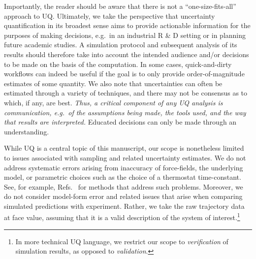 Importantly, the reader should be aware that there is not a ``one-size-fits-all'' approach to UQ.  Ultimately, we take the perspective that uncertainty quantification in its broadest sense aims to provide actionable information for the purposes of making decisions, e.g.\ in an industrial R \& D setting or in planning future academic studies.  A simulation protocol and subsequent analysis of its results should therefore take into account the intended audience and/or decisions to be made on the basis of the computation.  In some cases, quick-and-dirty workflows can indeed be useful if the goal is to only provide order-of-magnitude estimates of some quantity.  We also note that uncertainties can often be estimated through a variety of techniques, and there may not be consensus as to which, if any, are best.  {\it Thus, a critical component of any UQ analysis is communication, e.g.\ of the assumptions being made, the tools used, and the way that results are interpreted.}  Educated decisions can only be made through an understanding.  

While UQ is a central topic of this manuscript, our scope is nonetheless limited to issues associated with sampling and related uncertainty estimates.  We do not address systematic errors arising from inaccuracy of force-fields, the underlying model, or parametric choices such as the choice of a thermostat time-constant.  See, for example, Refs.~\cite{Leimkuhler,Rizzi2,Rizzi3,Rizzi4} for methods that address such problems.  Moreover, we do not consider model-form error and related issues that arise when comparing simulated predictions with experiment.  Rather, we take the raw trajectory data at face value, assuming that it is a valid description of the system of interest.\footnote{In more technical UQ language, we restrict our scope to {\it verification} of simulation results, as opposed to {\it validation}.}








